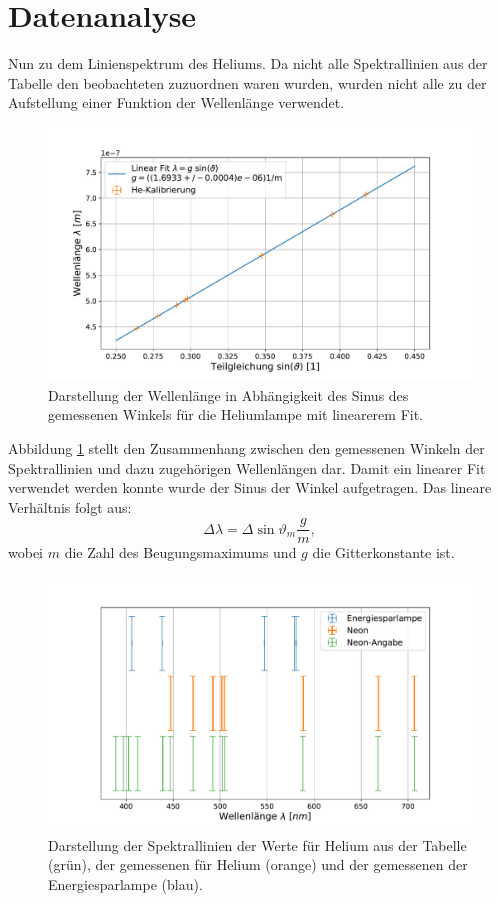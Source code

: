 \section{Datenanalyse} \label{sec:Analyse}
	
	
	Nun zu dem Linienspektrum des Heliums.
	Da nicht alle Spektrallinien aus der Tabelle den beobachteten zuzuordnen waren wurden, wurden nicht alle zu der Aufstellung einer Funktion der Wellenlänge verwendet.
	\begin{figure}[ht]
		\centering
		\includegraphics[width=\textwidth]{data/GitterConstPruef.pdf}
		\caption{Darstellung der Wellenlänge in Abhängigkeit des Sinus des gemessenen Winkels für die Heliumlampe mit linearerem Fit.}
		\label{fig:Funktion}	
	\end{figure}
	Abbildung \ref{fig:Funktion} stellt den Zusammenhang zwischen den gemessenen Winkeln der Spektrallinien und dazu zugehörigen Wellenlängen dar.
	Damit ein linearer Fit verwendet werden konnte wurde der Sinus der Winkel aufgetragen.
	Das lineare Verhältnis folgt aus:
	\begin{equation}
		\Delta\lambda = \Delta\sin{\vartheta_m} \frac{g}{m},
	\end{equation}
	wobei $m$ die Zahl des Beugungsmaximums	und $g$ die Gitterkonstante ist.
	\begin{figure}[ht]
		\centering
		\includegraphics[width=\textwidth]{data/EnergieSpar.pdf}
		\caption{Darstellung der Spektrallinien der Werte für Helium aus der Tabelle (grün), der gemessenen für Helium (orange) und der gemessenen der Energiesparlampe (blau).}
		\label{fig:Linien}	
	\end{figure}
